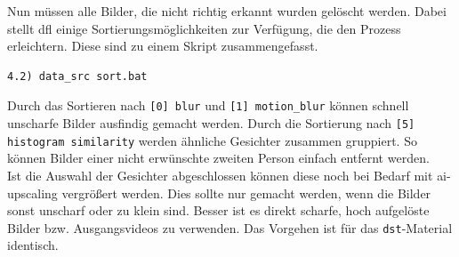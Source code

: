 Nun müssen alle Bilder, die nicht richtig erkannt wurden gelöscht werden.
Dabei stellt \gls{dfl} einige Sortierungsmöglichkeiten zur Verfügung, die den Prozess erleichtern.
Diese sind zu einem Skript zusammengefasst.
\begin{lstlisting}[label={lst:extraction-4},numbers=none]
    4.2) data_src sort.bat
\end{lstlisting}
Durch das Sortieren nach \texttt{[0] blur} und \texttt{[1] motion\_blur} können schnell unscharfe Bilder ausfindig gemacht werden.
Durch die Sortierung nach \texttt{[5] histogram similarity} werden ähnliche Gesichter zusammen gruppiert.
So können Bilder einer nicht erwünschte zweiten Person einfach entfernt werden.\\
Ist die Auswahl der Gesichter abgeschlossen können diese noch bei Bedarf mit \gls{ai-upscaling} vergrößert werden.
Dies sollte nur gemacht werden, wenn die Bilder sonst unscharf oder zu klein sind.
Besser ist es direkt scharfe, hoch aufgelöste Bilder bzw. Ausgangsvideos zu verwenden.
Das Vorgehen ist für das \texttt{dst}-Material identisch.\\[0.5cm]

